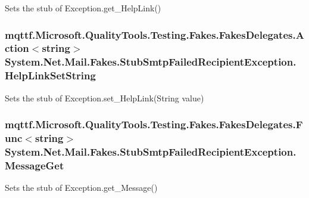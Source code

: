 Sets the stub of Exception.\-get\-\_\-\-Help\-Link()

\hypertarget{class_system_1_1_net_1_1_mail_1_1_fakes_1_1_stub_smtp_failed_recipient_exception_a7b61e79a724cf10ba965806e07588285}{
\subsubsection[{Help\-Link\-Set\-String}]{\setlength{\rightskip}{0pt plus 5cm}mqttf.\-Microsoft.\-Quality\-Tools.\-Testing.\-Fakes.\-Fakes\-Delegates.\-Action$<$string$>$ System.\-Net.\-Mail.\-Fakes.\-Stub\-Smtp\-Failed\-Recipient\-Exception.\-Help\-Link\-Set\-String}}\label{class_system_1_1_net_1_1_mail_1_1_fakes_1_1_stub_smtp_failed_recipient_exception_a7b61e79a724cf10ba965806e07588285}


Sets the stub of Exception.\-set\-\_\-\-Help\-Link(\-String value)

\hypertarget{class_system_1_1_net_1_1_mail_1_1_fakes_1_1_stub_smtp_failed_recipient_exception_a3ba40d5eaf3436c879fa848c6f01e8a2}{
\subsubsection[{Message\-Get}]{\setlength{\rightskip}{0pt plus 5cm}mqttf.\-Microsoft.\-Quality\-Tools.\-Testing.\-Fakes.\-Fakes\-Delegates.\-Func$<$string$>$ System.\-Net.\-Mail.\-Fakes.\-Stub\-Smtp\-Failed\-Recipient\-Exception.\-Message\-Get}}\label{class_system_1_1_net_1_1_mail_1_1_fakes_1_1_stub_smtp_failed_recipient_exception_a3ba40d5eaf3436c879fa848c6f01e8a2}


Sets the stub of Exception.\-get\-\_\-\-Message()

